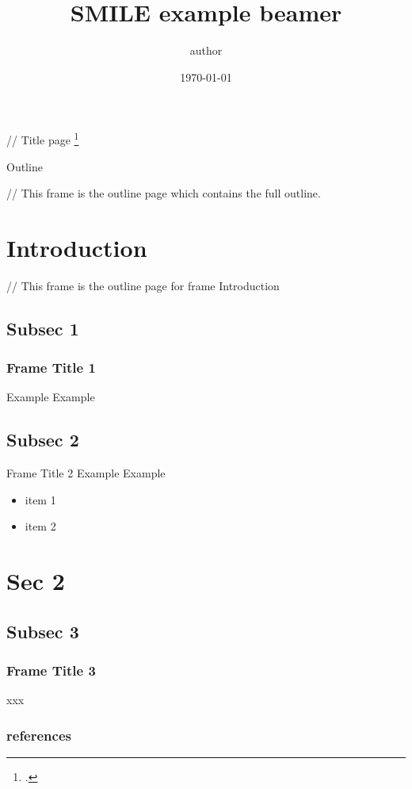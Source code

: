 \documentclass[aspectratio=1610]{beamer}
\title{SMILE example beamer\footfullcite{nasy_beamer_2022}}
\author{author}
\date\today
\begin{document}
\begin{frame}[plain]
  \titlepage
  // Title page \footcite{nasy_beamer_2022}
\end{frame}


\begin{frame}{Outline}
  \tableofcontents

  // This frame is the outline page which contains the full outline.
  \end{frame}

\section{Introduction}

\begin{frame}
  \tableofcontents[currentsection, subsectionstyle=show/show/hide]

  // This frame is the outline page for frame Introduction
\end{frame}


\subsection {Subsec 1}
\begin{frame}
  \frametitle{Frame Title 1}
  Example Example
\end{frame}


\subsection {Subsec 2}
\begin{frame}{Frame Title 2}
  Example Example\cite{bagaev_vdjdb_2020}

\begin{itemize}
    \item item 1
    \item item 2
\end{itemize}

\end{frame}


\section {Sec 2}

\begin{frame}
  \tableofcontents[currentsection, subsectionstyle=show/show/hide]
\end{frame}

\subsection {Subsec 3}
\begin{frame}
  \frametitle{Frame Title 3}
xxx
\end{frame}
\begin{frame}
	\frametitle{references}
	\nocite{*}%
	\printbibliography
\end{frame}
\end{document}
